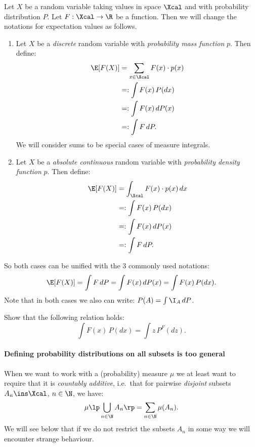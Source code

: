 \begin{Not}%
    Let $X$ be a  random variable taking values in space $\Xcal$ and with probability distribution $P$.
    Let $F: \Xcal \to \R$ be a function. Then we will change the notations for expectation values as follows.
 \begin{enumerate}
     \item Let $X$ be a \emph{discrete} random variable with \emph{probability mass function} $p$. Then define:
 \begin{align*}
     \E[F(X)] &= \sum_{x \in \Xcal} F(x) \cdot p(x) \\
         &=: \int F(x)  \, P(dx)\\
         &=: \int F(x)  \, dP(x)\\
         &=: \int F  \, dP.
 \end{align*}
  We will consider sums to be special cases of measure integrals.
     \item Let $X$ be a \emph{absolute continuous} random variable with \emph{probability density function} $p$. Then define:
 \begin{align*}
     \E[F(X)] &= \int_\Xcal F(x) \cdot p(x)\,dx \\
         &=: \int F(x)  \, P(dx)\\
         &=: \int F(x)  \, dP(x)\\
         &=: \int F  \, dP.
 \end{align*}
 \end{enumerate}
 So both cases can be unified with the 3 commonly used notations:
 \[ \E[F(X)] = \int F\,dP = \int F(x)\,dP(x) = \int F(x)\,P(dx).  \]
 Note that in both cases we also can write: $P(A) = \int \I_A \, dP$.
\end{Not}

\begin{Exc}
    Show that the following relation holds:
    \[ \int F(x)\,P(dx) = \int z \,P^F(dz).\]
\end{Exc}

\paragraph*{Defining probability distributions on all subsets is too general}%

\begin{Rem}\label{rem-power-set}
    When we want to work with a (probability) measure $\mu$ we at least want to require that it is \emph{countably additive}, i.e.\ that for pairwise \emph{disjoint} subsets $A_n \ins \Xcal$, $n \in \N$, we have:
    \[\mu\lp\bigcup_{n \in \N} A_n\rp = \sum_{n \in \N} \mu(A_n).\]
    We will see below that if we do not restrict the subsets $A_n$ in some way we will encounter strange behaviour.
\end{Rem}

